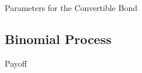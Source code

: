 \documentclass{beamer}
\begin{document}
\begin{frame}{Parameters for the Convertible Bond}

\end{frame}



\subsection{Binomial Process}

\begin{frame}{Payoff}

\end{frame}



\end{document}
